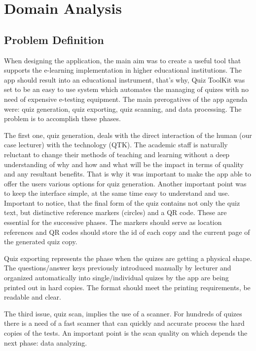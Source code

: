 \section{Domain Analysis}

\subsection{Problem Definition}

When designing the application, the main aim was to create a useful tool that supports the
e-learning implementation in higher educational institutions. The app should result into 
an educational instrument, that’s why, Quiz ToolKit was set to be an easy to use system 
which automates the managing of quizes with no need of expensive e-testing equipment. 
The main prerogatives of the app agenda were: quiz generation, quiz exporting, quiz scanning, 
and data processing. The problem is to accomplish these phases. 

The first one, quiz generation, deals with the direct interaction of the human (our case 
lecturer) with the technology (QTK). The academic staff is naturally reluctant to change their 
methods of teaching and learning without a deep understanding of why and how and what 
will be the impact in terms of quality and any resultant benefits. That is why it was 
important to make the app able to offer the users various options for quiz 
generation. Another important point was to keep the interface simple, at the same time 
easy to understand and use. Important to notice, that the final form of the quiz contains 
not only the quiz text, but distinctive reference markers (circles) and a QR code. These are 
essential for the successive phases. The markers should serve as location references and 
QR codes should store the id of each copy and the current page of the generated quiz copy.

Quiz exporting represents the phase when the quizes are getting a physical shape. The 
questions/answer keys previously introduced manually by lecturer and organized 
automatically into single/individual quizes by the app are being printed out in hard 
copies. The format should meet the printing requirements, be readable and clear. 

The third issue, quiz scan, implies the use of a scanner. For hundreds of quizes there is a 
need of a fast scanner that can quickly and accurate process the hard copies of the tests. 
An important point is the scan quality on which depends the next phase: data analyzing. 

